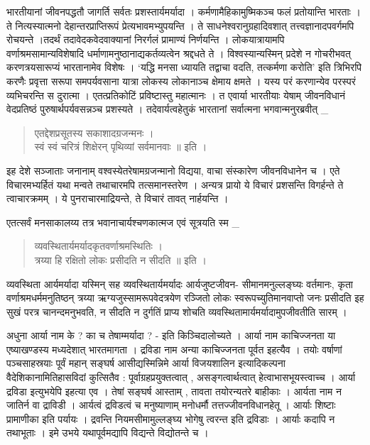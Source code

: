 भारतीयानां जीवनपद्धतौ जागर्ति सर्वतः प्रशस्तार्यमर्यादा । कर्मणामैहिकामुष्मिकञ्च फलं प्रतोयान्ति भारताः । ते नित्यस्यात्मनो देहान्तरप्राप्तिरूपं प्रेत्यभावमभ्युपयन्ति । ते साधनेश्वरानुग्रहादिवशात् तत्त्वज्ञानादपवर्गमपि रोचयन्ते ।तदर्थं तदावेदकवेदवाक्यानां निरर्गलं प्रामाण्यं निर्णयन्ति । लोकयात्रायामपि वर्णाश्रमसामान्यविशेषादि धर्माणामनुष्ठानाद्यकर्तव्यत्वेन श्रद्दधते ते । विश्वस्यान्यस्मिन् प्रदेशे न गोचरीभवत् करणत्रयसारूप्यं भारतानामेव विशेषः  । ‘यद्धि मनसा ध्यायति  तद्वाचा वदति, तत्कर्मणा करोति’ इति त्रिभिरपि करणैः प्रवृत्ता सरूपा समपर्यवसाना यात्रा लोकस्य लोकानाञ्च क्षेमाय क्षमते । यस्य परं करणान्येव परस्परं व्यभिचरन्ति स दुरात्मा । एतत्प्रतिकोटिं प्रविष्टास्तु महात्मानः । त एवार्या भारतीयाः येषाम् जीवनविधानं वेदप्रतिष्ठं पुरुषार्थपर्यवसन्नञ्च प्रशस्यते । तदेवार्यत्वहेतुकं भारतानां सर्वात्मना भगवान्मनुरब्रवीत् _ 
\begin{verse}
एतद्देशप्रसूतस्य सकाशादग्रजन्मनः ।\\
स्वं स्वं चरित्रं शिक्षेरन् पृथिव्यां सर्वमानवाः ॥ इति ।
\end{verse}
इह देशे सञ्जाताः जनानाम् वश्वस्येतरेषामग्रजन्मानो विद्यया, वाचा संस्कारेण जीवनविधानेन च । एते विचारमभ्यर्हितं यथा मन्वते तथाचारमपि तत्समानस्तरेण । अन्यत्र प्रायो ये विचारं प्रशसन्ति विगर्हन्ते ते त्वाचारक्रमम् । ये पुनराचारमाद्रियन्ते, ते विचारं तावत् नार्हयन्ति ।

एतत्सर्वं मनसाकालय्य तत्र भवानाचार्यश्चणकात्मज एवं सूत्रयति स्म \_
\begin{verse}
व्यवस्थितार्यमर्यादकृतवर्णाश्रमस्थितिः । \\
त्रय्या हि रक्षितो लोकः प्रसीदति न सीदति ॥ इति ।
\end{verse}
व्यवस्थिता आर्यमर्यादा यस्मिन् सह व्यवस्थितार्यमर्यादः आर्यजुष्टजीवन- सीमानमनुल्लङ्घ्यः वर्तमानः, कृता वर्णाश्रमधर्ममनुतिष्ठन् त्रय्या ऋग्यजुस्सामरूपवेदत्रयेण रञ्जितो लोकः स्वरूपच्युतिमानवाप्तो जनः प्रसीदति इह सुखं परत्र चानन्दमनुभवति, न सीदति न दुर्गतिं प्राप्य शोचति व्यवस्थितामार्यमर्यादामुपजीवतीति सारम् ।

अधुना आर्या नाम के ? का च तेषाम्मर्यादा ? - इति किञ्चिदालोच्यते । आर्या नाम काचिज्जनता या एष्याखण्डस्य मध्यदेशात् भारतमागता । द्रविडा नाम अन्या काचिज्जनता पूर्वत इहत्यैव । तयोः वर्षाणां पञ्चसाहस्रयाः पूर्वं महान् सङ्घर्ष आसीद्यस्मिन्निमे आर्या विजयशालिन इत्यादिकल्पना वैदेशिकानामितिहासविदां कुत्सितैव : पूर्वाग्रहप्रयुक्तत्वात् , असङ्गत्वार्थत्वात् हेत्वाभासभूयस्त्वाच्च । आर्या द्रविडा इत्युभयेपि इहत्या एव । तेषां सङ्घर्ष आस्ताम् , तावता तयोरन्यतरे बाहीकाः । आर्यता नाम न जातिर्न वा द्राविडी । आर्यत्वं द्रविडत्वं च मनुष्याणाम् मनोधर्मौ तत्तज्जीवनविधानहेतू । आर्याः शिष्टाः प्रामाणीका इति पर्यायः । द्रवन्ति नियमसीमामुल्लङ्घ्य भोगेषु त्वरन्त इति द्रविडाः । आर्याः कदापि न तथाभूताः । इमे उभये यथापूर्वमद्यापि विद्यन्ते विद्योतन्ते च । 

